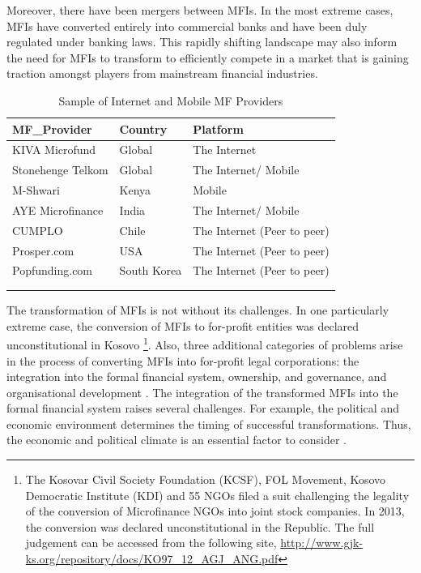 \documentclass[a4paper, nobind]{templates/ociamthesis}
\begin{document}
Moreover, there have been mergers between MFIs. In the most extreme cases, MFIs have converted entirely into commercial banks and have been duly regulated under banking laws. This rapidly shifting landscape may also inform the need for MFIs to transform to efficiently compete in a market that is gaining traction amongst players from mainstream financial industries.

\begin{table}

\caption{\label{tab:unnamed-chunk-4}Sample of Internet and Mobile MF Providers}
\centering
\fontsize{8}{10}\selectfont
\begin{tabu} to 
\toprule
MF\_Provider & Country & Platform\\
\midrule
KIVA Microfund & Global & The Internet\\
Stonehenge Telkom & Global & The Internet/ Mobile\\
M-Shwari & Kenya & Mobile\\
AYE Microfinance & India & The Internet/ Mobile\\
CUMPLO & Chile & The Internet (Peer to peer)\\
\addlinespace
Prosper.com & USA & The Internet (Peer to peer)\\
Popfunding.com & South Korea & The Internet (Peer to peer)\\
\bottomrule
{}\\
\\
\end{tabu}
\end{table}

The transformation of MFIs is not without its challenges. In one particularly extreme case, the conversion of MFIs to for-profit entities was declared unconstitutional in Kosovo \autocite{hasani2013ustav} \footnote{The Kosovar Civil Society Foundation (KCSF), FOL Movement, Kosovo Democratic Institute (KDI) and 55 NGOs filed a suit challenging the legality of the conversion of Microfinance NGOs into joint stock companies. In 2013, the conversion was declared unconstitutional in the Republic. The full judgement can be accessed from the following site, \url{http://www.gjk-ks.org/repository/docs/KO97_12_AGJ_ANG.pdf}}. Also, three additional categories of problems arise in the process of converting MFIs into for-profit legal corporations: the integration into the formal financial system, ownership, and governance, and organisational development \autocite{campion1999institutional}. The integration of the transformed MFIs into the formal financial system raises several challenges. For example, the political and economic environment determines the timing of successful transformations. Thus, the economic and political climate is an essential factor to consider \autocite{kenya2012transforming}.
\end{document}
